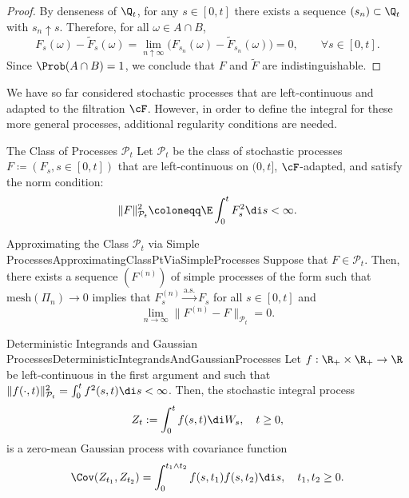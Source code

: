 \begin{proof}
	By denseness of \(\Q_t\), for any \(s \in [0, t]\) there exists a sequence \((s_n) \subset \Q_t\) with \(s_n \uparrow s\). Therefore, for all \(\omega \in A \cap B\),
	\begin{equation}\label{eq:Indistinguishable}
		F_s(\omega) - \widetilde{F}_s(\omega)
		= \lim_{n \uparrow \infty} \big(F_{s_n}(\omega) - \widetilde{F}_{s_n}(\omega)\big)
		= 0, \qquad \forall s \in [0, t].
	\end{equation}
	Since \(\Prob(A \cap B) = 1\), we conclude that \(F\) and \(\widetilde{F}\) are indistinguishable.
\end{proof}

We have so far considered stochastic processes that are left-continuous and adapted to the filtration \(\cF\). However, in order to define the \Ito{} integral for these more general processes, additional regularity conditions are needed.

\begin{defn}{The Class of Processes \(\mathcal{P}_t\)}{}
	Let \(\mathcal{P}_t\) be the class of stochastic processes \(F \coloneqq (F_s, s \in [0, t])\) that are left-continuous on \((0, t]\), \(\cF\)-adapted, and satisfy the norm condition:
	\begin{equation*}
		\|F\|_{\mathcal{P}_t}^2 \coloneqq \E \int_0^t F_s^2 \di s < \infty.
	\end{equation*}
\end{defn}

\begin{thm}{Approximating the Class \(\mathcal{P}_t\) via Simple Processes}{ApproximatingClassPtViaSimpleProcesses}
	Suppose that \(F \in \mathcal{P}_t\). Then, there exists a sequence \((F^{(n)})\) of simple processes of the form  such that \(\mathrm{mesh}(\Pi_n) \to 0\) implies that \(F_s^{(n)} \xrightarrow{\text{a.s.}} F_s\) for all \(s \in [0, t]\) and
	\begin{equation}\label{eq:L2ConvergenceSimple}
		\lim_{n \to \infty} \|F^{(n)} - F\|_{\mathcal{P}_t} = 0.
	\end{equation}
\end{thm}

\begin{prop}{Deterministic Integrands and Gaussian Processes}{DeterministicIntegrandsAndGaussianProcesses}
	Let \(f : \R_+ \times \R_+ \to \R\) be left-continuous in the first argument and such that \(\|f(\cdot, t)\|_{\mathcal{P}_t}^2 = \int_0^t f^2(s, t) \di s < \infty\). Then, the stochastic integral process
	\begin{equation}\label{eq:GaussianIntegralProcess}
		Z_t := \int_0^t f(s, t) \di W_s, \quad t \ge 0,
	\end{equation}
	is a zero-mean Gaussian process with covariance function
	\begin{equation}\label{eq:GaussianCovariance}
		\Cov(Z_{t_1}, Z_{t_2}) = \int_0^{t_1 \wedge t_2} f(s, t_1) f(s, t_2) \di s, \quad t_1, t_2 \ge 0.
	\end{equation}
\end{prop}

